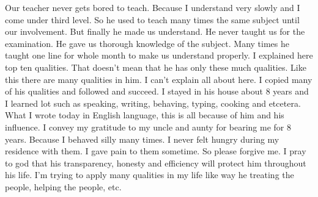 Our teacher never gets bored to teach. Because I understand very slowly and I come under third level. So he used to teach many times the same subject until our involvement. But finally he made us understand. He never taught us for the examination. He gave us thorough knowledge of the subject. Many times he taught one line for whole month to make us understand properly.
I explained here top ten qualities. That doesn’t mean that he has only these much qualities. Like this there are many qualities in him. I can’t explain all about here. I copied many of his qualities and followed and succeed. I stayed in his house about 8 years and I learned lot such as speaking, writing, behaving, typing, cooking and etcetera. What I wrote today in English language, this is all because of him and his influence. I convey my gratitude to my uncle and aunty for bearing me for 8 years. Because I behaved silly many times. I never felt hungry during my residence with them. I gave pain to them sometime. So please forgive me. I pray to god that his transparency, honesty and efficiency will protect him throughout his life. I’m trying to apply many qualities in my life like way he treating the people, helping the people, etc.
